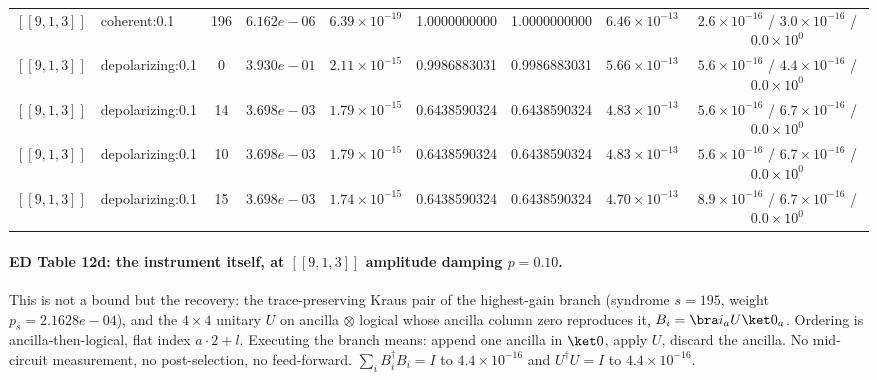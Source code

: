 \documentclass[10pt,a4paper]{article}
\begin{document}
\begin{longtable}{llccccccc}
$[\![9,1,3]\!]$ & coherent:0.1 & 196 & $6.162e-06$ & $6.39\times 10^{-19}$ & 1.0000000000 & 1.0000000000 & $6.46\times 10^{-13}$ & $2.6\times 10^{-16}$ / $3.0\times 10^{-16}$ / $0.0\times 10^{0}$ \\
$[\![9,1,3]\!]$ & depolarizing:0.1 & 0 & $3.930e-01$ & $2.11\times 10^{-15}$ & 0.9986883031 & 0.9986883031 & $5.66\times 10^{-13}$ & $5.6\times 10^{-16}$ / $4.4\times 10^{-16}$ / $0.0\times 10^{0}$ \\
$[\![9,1,3]\!]$ & depolarizing:0.1 & 14 & $3.698e-03$ & $1.79\times 10^{-15}$ & 0.6438590324 & 0.6438590324 & $4.83\times 10^{-13}$ & $5.6\times 10^{-16}$ / $6.7\times 10^{-16}$ / $0.0\times 10^{0}$ \\
$[\![9,1,3]\!]$ & depolarizing:0.1 & 10 & $3.698e-03$ & $1.79\times 10^{-15}$ & 0.6438590324 & 0.6438590324 & $4.83\times 10^{-13}$ & $5.6\times 10^{-16}$ / $6.7\times 10^{-16}$ / $0.0\times 10^{0}$ \\
$[\![9,1,3]\!]$ & depolarizing:0.1 & 15 & $3.698e-03$ & $1.74\times 10^{-15}$ & 0.6438590324 & 0.6438590324 & $4.70\times 10^{-13}$ & $8.9\times 10^{-16}$ / $6.7\times 10^{-16}$ / $0.0\times 10^{0}$ \\
\bottomrule\end{longtable}

\paragraph*{ED Table 12d: the instrument itself, at $[\![9,1,3]\!]$ amplitude
damping $p=0.10$.}
This is not a bound but the recovery: the trace-preserving Kraus pair of the
highest-gain branch (syndrome $s=195$, weight $p_s=2.1628e-04$), and the $4\times4$
unitary $U$ on ancilla$\,\otimes\,$logical whose ancilla column zero reproduces
it, $B_i=\bra i_aU\ket0_a$.  Ordering is ancilla-then-logical, flat index
$a\cdot2+l$.  Executing the branch means: append one ancilla in $\ket0$, apply
$U$, discard the ancilla.  No mid-circuit measurement, no post-selection, no
feed-forward.  $\sum_iB_i^\dagger B_i=I$ to $4.4\times 10^{-16}$ and $U^\dagger U=I$ to $4.4\times 10^{-16}$.
\end{document}
